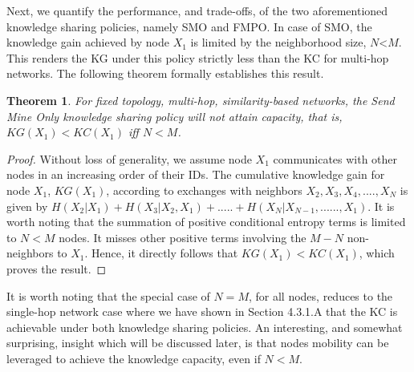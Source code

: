 \documentclass[conference]{IEEEtran}
\newtheorem{theorem}{Theorem}
\theoremstyle{definition}
\begin{document}
Next, we quantify the performance, and trade-offs, of the two aforementioned knowledge sharing policies, namely SMO and FMPO. In case of
SMO, the knowledge gain achieved by node $X_1$ is limited by the neighborhood size, $N$<$M$. This renders the KG under this policy strictly less than the KC for multi-hop networks. The following theorem formally establishes this result.
\vspace{-0.2 cm}
\begin{theorem}
For fixed topology, multi-hop, similarity-based networks, the {\it Send Mine Only} knowledge sharing policy will not attain capacity, that is, $KG(X_1)<KC(X_1)$ iff $N<M$.
\end{theorem}
%
\vspace{-0.4 cm}
\begin{proof}
Without loss of generality, we assume node $X_1$ communicates with other nodes in an increasing order of their IDs. The cumulative knowledge gain for node $X_1$, $KG(X_1)$, according to exchanges with neighbors $X_2, X_3, X_4,...., X_{N}$ is given by $H(X_2|X_1) + H(X_3|X_2,X_1) + .....+ H(X_{N}|X_{N-1}, ......, X_1)$. It is worth noting that the summation of positive conditional entropy terms is limited to $N<M$ nodes. It misses other positive terms involving the $M-N$ non-neighbors to $X_1$. Hence, it directly follows that $KG(X_1)<KC(X_1)$, which proves the result.
%
\end{proof}
%
\vspace{-0.5 cm}
It is worth noting that the special case of $N=M$, for all nodes, reduces to the single-hop network case where we have shown in Section 4.3.1.A that the KC is achievable under both knowledge sharing policies.
%
%
An interesting, and somewhat surprising, insight which will be discussed later, is that nodes mobility can be leveraged to achieve the knowledge capacity, even if $N<M$.

\end{document}
